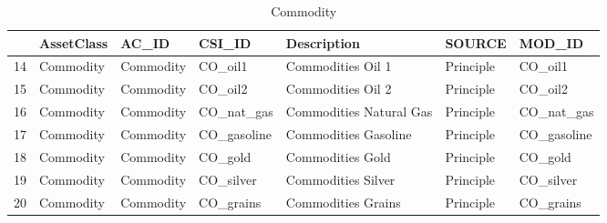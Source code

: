 \begin{longtable}{rllllll}
\caption{Commodity} \\ 
  \hline
 & AssetClass & AC\_ID & CSI\_ID & Description & SOURCE & MOD\_ID \\ 
  \hline
14 & Commodity & Commodity & CO\_oil1 & Commodities Oil 1 & Principle & CO\_oil1 \\ 
  15 & Commodity & Commodity & CO\_oil2 & Commodities Oil 2 & Principle & CO\_oil2 \\ 
  16 & Commodity & Commodity & CO\_nat\_gas & Commodities Natural Gas & Principle & CO\_nat\_gas \\ 
  17 & Commodity & Commodity & CO\_gasoline & Commodities Gasoline & Principle & CO\_gasoline \\ 
  18 & Commodity & Commodity & CO\_gold & Commodities Gold & Principle & CO\_gold \\ 
  19 & Commodity & Commodity & CO\_silver & Commodities Silver & Principle & CO\_silver \\ 
  20 & Commodity & Commodity & CO\_grains & Commodities Grains & Principle & CO\_grains \\ 
   \hline
\hline
\end{longtable}
